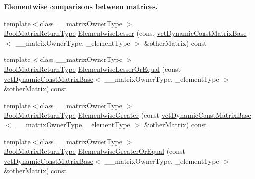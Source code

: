 \begin{Indent}{\bf Elementwise comparisons between matrices.}
\begin{DoxyCompactItemize}
\item 
{\footnotesize template$<$class \-\_\-\-\_\-matrix\-Owner\-Type $>$ }\\\hyperlink{classvct_dynamic_const_matrix_base_ac71d88dda7abaaeb2276b83f2e49def7}{Bool\-Matrix\-Return\-Type} \hyperlink{classvct_dynamic_const_matrix_base_ad3ac49d89bf4bc67cda0e033098d1449}{Elementwise\-Lesser} (const \hyperlink{classvct_dynamic_const_matrix_base}{vct\-Dynamic\-Const\-Matrix\-Base}$<$ \-\_\-\-\_\-matrix\-Owner\-Type, \-\_\-element\-Type $>$ \&other\-Matrix) const 
\item 
{\footnotesize template$<$class \-\_\-\-\_\-matrix\-Owner\-Type $>$ }\\\hyperlink{classvct_dynamic_const_matrix_base_ac71d88dda7abaaeb2276b83f2e49def7}{Bool\-Matrix\-Return\-Type} \hyperlink{classvct_dynamic_const_matrix_base_a70bd8148355ce894b3c072f0fb6d1372}{Elementwise\-Lesser\-Or\-Equal} (const \hyperlink{classvct_dynamic_const_matrix_base}{vct\-Dynamic\-Const\-Matrix\-Base}$<$ \-\_\-\-\_\-matrix\-Owner\-Type, \-\_\-element\-Type $>$ \&other\-Matrix) const 
\item 
{\footnotesize template$<$class \-\_\-\-\_\-matrix\-Owner\-Type $>$ }\\\hyperlink{classvct_dynamic_const_matrix_base_ac71d88dda7abaaeb2276b83f2e49def7}{Bool\-Matrix\-Return\-Type} \hyperlink{classvct_dynamic_const_matrix_base_aec3e77640ffca9a348ca0725dc183668}{Elementwise\-Greater} (const \hyperlink{classvct_dynamic_const_matrix_base}{vct\-Dynamic\-Const\-Matrix\-Base}$<$ \-\_\-\-\_\-matrix\-Owner\-Type, \-\_\-element\-Type $>$ \&other\-Matrix) const 
\item 
{\footnotesize template$<$class \-\_\-\-\_\-matrix\-Owner\-Type $>$ }\\\hyperlink{classvct_dynamic_const_matrix_base_ac71d88dda7abaaeb2276b83f2e49def7}{Bool\-Matrix\-Return\-Type} \hyperlink{classvct_dynamic_const_matrix_base_af784b65a11b22ebb7a9c3b505e7322a5}{Elementwise\-Greater\-Or\-Equal} (const \hyperlink{classvct_dynamic_const_matrix_base}{vct\-Dynamic\-Const\-Matrix\-Base}$<$ \-\_\-\-\_\-matrix\-Owner\-Type, \-\_\-element\-Type $>$ \&other\-Matrix) const 
\end{DoxyCompactItemize}
\end{Indent}
